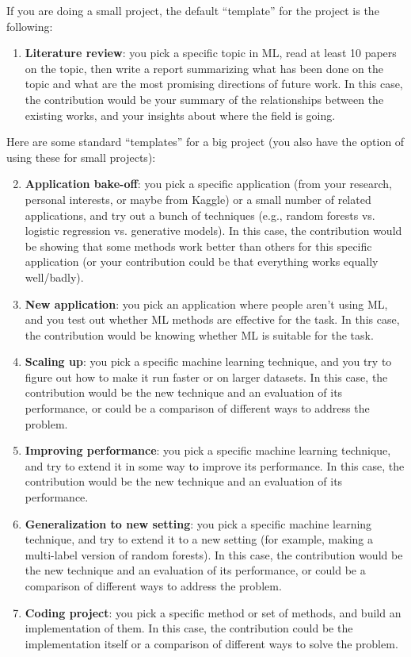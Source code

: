 \documentclass{article}
\def\enum#1{\begin{enumerate}#1\end{enumerate}}
\begin{document}
If you are doing a small project, the default ``template'' for the project is the following:
\enum{
\item \textbf{Literature review}: you pick a specific topic in ML, read at least 10 papers on the topic, then write a report summarizing what has been done on the topic and what are the most promising directions of future work. In this case, the contribution would be your summary of the relationships between the existing works, and your insights about where the field is going.
}
Here are some standard ``templates'' for a big project (you also have the option of using these for small projects):
\enum{
\setcounter{enumi}{1}
\item \textbf{Application bake-off}: you pick a specific application (from your research, personal interests, or maybe from Kaggle) or a small number of related applications, and try out a bunch of techniques (e.g., random forests vs. logistic regression vs. generative models). In this case, the contribution would be showing that some methods work better than others for this specific application (or your contribution could be that everything works equally well/badly).
\item \textbf{New application}: you pick an application where people aren't using ML, and you test out whether ML methods are effective for the task. In this case, the contribution would be knowing whether ML is suitable for the task.
\item \textbf{Scaling up}: you pick a specific machine learning technique, and you try to figure out how to make it run faster or on larger datasets. In this case, the contribution would be the new technique and an evaluation of its performance, or could be a comparison of different ways to address the problem.
\item \textbf{Improving performance}: you pick a specific machine learning technique, and try to extend it in some way to improve its performance. In this case, the contribution would be the new technique and an evaluation of its performance.
\item \textbf{Generalization to new setting}: you pick a specific machine learning technique, and try to extend it to a new setting (for example, making a multi-label version of random forests).  In this case, the contribution would be the new technique and an evaluation of its performance, or could be a comparison of different ways to address the problem.
\item \textbf{Coding project}: you pick a specific method or set of methods, and build an implementation of them. In this case, the contribution could be the implementation itself or a comparison of different ways to solve the problem.
}
\end{document}
